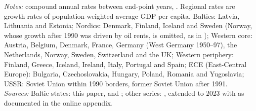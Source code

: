 \begin{table}[htbp]
\begin{threeparttable}
\begin{tablenotes}
\textit{Notes:} compound annual rates between end-point years, \intlnineteen{}. Regional rates are growth rates of population-weighted average GDP per capita. Baltics: Latvia, Lithuania and Estonia; Nordics: Denmark, Finland, Iceland and Sweden (Norway, whose growth after 1990 was driven by oil rents, is omitted, as in \cite{klimantas2025thesis}); Western core: Austria, Belgium, Denmark, France, Germany (West Germany 1950--97), the Netherlands, Norway, Sweden, Switzerland and the UK; Western periphery: Finland, Greece, Iceland, Ireland, Italy, Portugal and Spain; ECE (East-Central Europe): Bulgaria, Czechoslovakia, Hungary, Poland, Romania and Yugoslavia; USSR: Soviet Union within 1990 borders, former Soviet Union after 1991. \textit{Sources:} Baltic states: this paper, \textcite{klimantas2026soviet} and \textcite{klimantas2025estonia}; other series: \textcite{mpd2023}, extended to 2023 with \textcite{wdi2024} as documented in the online appendix.
\end{tablenotes}
\end{threeparttable}
\end{table}
